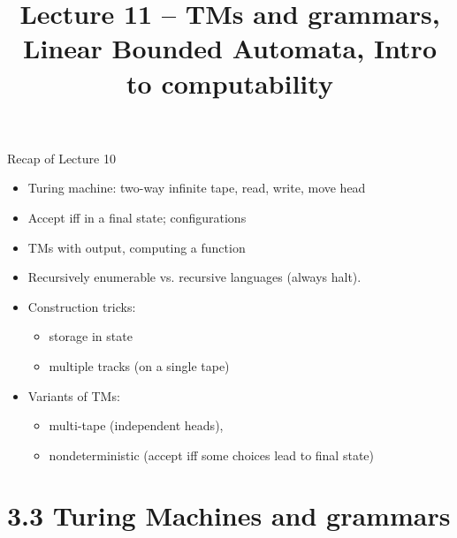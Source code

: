 \documentclass[handout]{beamer}
\title{Lecture 11 -- TMs and grammars, Linear Bounded Automata, Intro to computability}
\begin{document}
\frame{\titlepage}


\begin{frame}{Recap of Lecture 10}
	
    \begin{itemize}        
        \item Turing machine: two-way infinite tape, read, write, move head
        \item Accept iff in a final state; configurations
        \item TMs with output, computing a function
        \item Recursively enumerable vs. recursive languages (always halt).
        \item Construction tricks: 
        \begin{itemize}
            \item storage in state
            \item multiple tracks (on a single tape)
        \end{itemize}
        \item Variants of TMs: 
        \begin{itemize}
            \item multi-tape (independent heads),
            \item nondeterministic (accept iff some choices lead to final state)
        \end{itemize}  
    \end{itemize}
	
\end{frame}


\section{3.3 Turing Machines and grammars}
\end{document}
